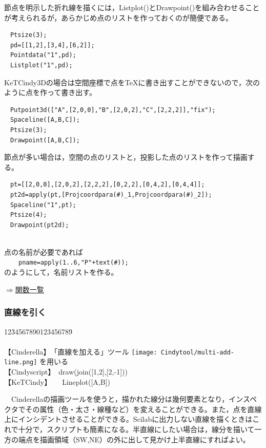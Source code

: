 \documentclass[papersize,a4paper,12pt,uplatex]{jsarticle}
\begin{document}
節点を明示した折れ線を描くには，Listplot()とDrawpoint()を組み合わせることが考えられるが，あらかじめ点のリストを作っておくのが簡便である。
\begin{verbatim}
　Ptsize(3);
　pd=[[1,2],[3,4],[6,2]];
　Pointdata("1",pd);
　Listplot("1",pd);
\end{verbatim}

KeTCindy3Dの場合は空間座標で点をTeXに書き出すことができないので，次のように点を作って書き出す。
\begin{verbatim}
　Putpoint3d(["A",[2,0,0],"B",[2,0,2],"C",[2,2,2]],"fix");
　Spaceline([A,B,C]);
　Ptsize(3);
　Drawpoint([A,B,C]);
\end{verbatim}
節点が多い場合は，空間の点のリストと，投影した点のリストを作って描画する。
\begin{verbatim}
　pt=[[2,0,0],[2,0,2],[2,2,2],[0,2,2],[0,4,2],[0,4,4]];
　pt2d=apply(pt,[Projcoordpara(#)_1,Projcoordpara(#)_2]);
　Spaceline("1",pt);
　Ptsize(4);
　Drawpoint(pt2d);
\end{verbatim}
　　　　　　　\\

点の名前が必要であれば\\
　　\verb|pname=apply(1..6,"P"+text(#));|\\
のようにして，名前リストを作る。\\ 
\begin{flushright} \hyperlink{functionlist3d}{$\Rightarrow$関数一覧}\end{flushright}


\subsubsection{直線を引く}

\begin{tabbing}
12\=34567890123456789\=\kill\\
　\\
\>【Cinderella】　\>「直線を加える」ツール \texttt{[image: Cindytool/multi-add-line.png]} を用いる　\\ 
\>【Cindyscript】　\>draw(join([1,2],[2,-1]))\\
 \>【KeTCindy】　　\>Lineplot([A,B])　\\
\end{tabbing}
　Cinderellaの描画ツールを使うと，描かれた線分は幾何要素となり，インスペクタでその属性（色・太さ・線種など）を変えることができる。また，点を直線上にインシデントさせることができる。Scilabに出力しない直線を描くときはこれで十分で，スクリプトも簡素になる。半直線にしたい場合は，線分を描いて一方の端点を描画領域（SW,NE）の外に出して見かけ上半直線にすればよい。
\end{document}

